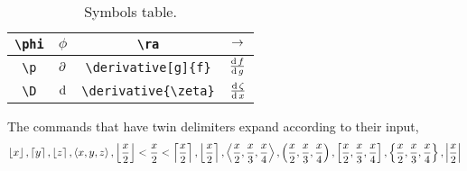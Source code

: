 \documentclass{article}
\newcommand{\bk}{\textbackslash}
\begin{document}
\begin{table}[hbtp]
\begin{tabular}{||c | c | c | c ||}
    \texttt{\bk phi}           & $\phi$       & \texttt{\bk ra}                     & $\ra$                 \\ \hline
    \texttt{\bk p}             & $\p$         & \texttt{\bk derivative[g]\{f\}}     & $\derivative[g]{f}$   \\ \hline
    \texttt{\bk D}             & $\D$         & \texttt{\bk derivative\{\bk zeta\}} & $\derivative{\zeta}$  \\ \hline
  \end{tabular}
  \caption{Symbols table.}%
  \label{symbols}%
\end{table}%

The commands that have twin delimiters expand according to their input,
\[
  \floor{x}, \ceil{y}, \near{z}, \arr{x,y,z},
  \floor{\frac{x}{2}} < \frac{x}{2} < \ceil{\frac{x}{2}},
  \near{\frac{x}{2}},
  \arr{\frac{x}{2}, \frac{x}{3}, \frac{x}{4}},
  \paren{\frac{x}{2}, \frac{x}{3}, \frac{x}{4}},
  \brk{\frac{x}{2}, \frac{x}{3}, \frac{x}{4}},
  \curl{\frac{x}{2}, \frac{x}{3}, \frac{x}{4}},
  \abs{\frac{x}{2}}
\]
\end{document}
